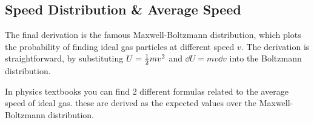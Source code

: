 \documentclass[class=article, crop=false, 12pt]{standalone}
\begin{document}
\subsection{Speed Distribution \& Average Speed}

The final derivation is the famous Maxwell-Boltzmann distribution,
which plots the probability of finding ideal gas particles at different speed $v$.
The derivation is straightforward,
by substituting $U = \frac{1}{2} mv^2$ and $\dd{U}=mv\dd{v}$ into the Boltzmann distribution.


In physics textbooks you can find 2 different formulas related to the average speed of ideal gas. 
these are derived as the expected values over the Maxwell-Boltzmann distribution.
\end{document}
